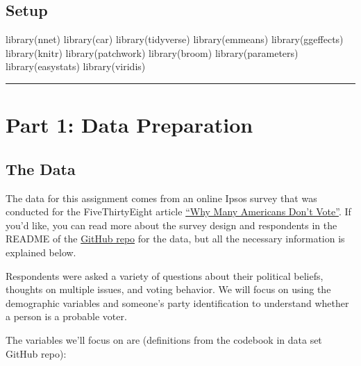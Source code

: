 \documentclass[
  letterpaper,
  DIV=11,
  numbers=noendperiod]{scrartcl}
\newenvironment{Shaded}{\begin{snugshade}}{\end{snugshade}}
\newcommand{\FunctionTok}[1]{\textcolor[rgb]{0.28,0.35,0.67}{#1}}
\newcommand{\NormalTok}[1]{\textcolor[rgb]{0.00,0.23,0.31}{#1}}
\begin{document}
\subsection{Setup}\label{setup}

\begin{Shaded}
\begin{Highlighting}[]
\FunctionTok{library}\NormalTok{(nnet)}
\FunctionTok{library}\NormalTok{(car)}
\FunctionTok{library}\NormalTok{(tidyverse)}
\FunctionTok{library}\NormalTok{(emmeans)}
\FunctionTok{library}\NormalTok{(ggeffects)}
\FunctionTok{library}\NormalTok{(knitr)}
\FunctionTok{library}\NormalTok{(patchwork)}
\FunctionTok{library}\NormalTok{(broom)}
\FunctionTok{library}\NormalTok{(parameters)}
\FunctionTok{library}\NormalTok{(easystats)}
\FunctionTok{library}\NormalTok{(viridis)}
\end{Highlighting}
\end{Shaded}

\begin{center}\rule{0.5\linewidth}{0.5pt}\end{center}

\section{Part 1: Data Preparation}\label{part-1-data-preparation}

\subsection{The Data}\label{the-data}

The data for this assignment comes from an online Ipsos survey that was
conducted for the FiveThirtyEight article
\href{https://projects.fivethirtyeight.com/non-voters-poll-2020-election/}{``Why
Many Americans Don't Vote''}. If you'd like, you can read more about the
survey design and respondents in the README of the
\href{https://github.com/fivethirtyeight/data/tree/master/non-voters}{GitHub
repo} for the data, but all the necessary information is explained
below.

Respondents were asked a variety of questions about their political
beliefs, thoughts on multiple issues, and voting behavior. We will focus
on using the demographic variables and someone's party identification to
understand whether a person is a probable voter.

The variables we'll focus on are (definitions from the codebook in data
set GitHub repo):
\end{document}
